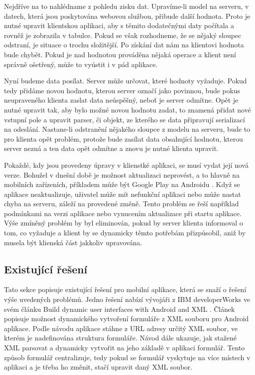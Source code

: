 Nejdříve na to nahlédname z pohledu zisku dat. Upravíme-li model na serveru, v datech, která jsou poskytována webovou službou, přibude další hodnota. Proto je nutné upravit klientskou aplikaci, aby s těmito dodatečnými daty počítala a rovněž je zobrazila v tabulce. Pokud se však rozhodneme, že se nějaký sloupec odstraní, je situace o trochu složitější. Po získání dat nám na klientovi hodnota bude chybět. Pokud  je nad hodnotou prováděna nějaká operace a klient není správně ošetřený, může to vyústit i v pád aplikace.

Nyní budeme data posílat. Server může určovat, které hodnoty vyžaduje. Pokud tedy přidáme novou hodnotu, kterou server označí jako povinnou, bude pokus neupraveného klienta zaslat data neúspěšný, neboť je server odmítne. Opět je nutné upravit tak, aby bylo možné novou hodnotu zadat, to znamená přidat nové vstupní pole a upravit parser, či objekt, ze kterého se data připravují serializací na odeslání. Nastane-li odstranění nějakého sloupce z modelu na serveru, bude to pro klienta opět problém, protože bude zasílat data obsahující hodnotu, kterou server nezná a ten data opět odmítne a znovu je nutné klienta upravit. 

Pokaždé, kdy jsou provedeny úpravy v klienstké aplikaci, se musí vydat její nová verze. Bohužel v dnešní době je možnost aktualizaci neprovést, a to hlavně na mobilních zařízeních, příkladem může být Google Play na Androidu \cite{android-auto-update}. Když se aplikace neaktualizuje, uživatel může mít nefunkční aplikaci nebo může nastat chyba na serveru, záleží na provedené změně. Tento problém se řeší například podmínkami na verzi aplikace nebo vynucením aktualizace při startu aplikace. Výše zmíněný problém by byl eliminován, pokud by server klienta informoval o tom, co vyžaduje a klient by se dynamicky těmto potřebám přizpůsobil, aniž by musela být klienská část jakkoliv upravována.

\subsection{Existující řešení}
Tato sekce popisuje existující řešení pro mobilní aplikace, která se snaží o řešení výše uvedených problémů. Jedno řešení nabízí vývojáři z IBM developerWorks ve svém článku Build dynamic user interfaces with Android and XML \cite{dynamic-android-xml}. Článek popisuje možnost dynamického vytvoření formuláře z XML souboru pro Android aplikace. Podle návodu aplikace stáhne z URL adresy určitý XML soubor, ve kterém je nadefinována struktura formuláře. Návod dále ukazuje, jak stažené XML parsovat a dynamicky vytvořit na jeho základě v aplikaci formulář. Tento způsob formulář centralizuje, tedy pokud se formulář vyskytuje na více místech v aplikaci a je třeba ho změnit, stačí upravit daný XML soubor.

